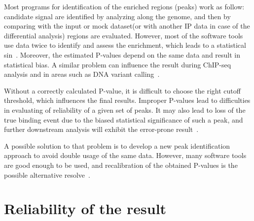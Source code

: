 Most programs for identification of the enriched regions (peaks) work as follow: candidate signal are identified by analyzing along the genome, and then by comparing with the input or mock dataset(or with another IP data in case of the differential analysis) regions are evaluated. 
However, most of the software tools use data twice to identify and assess the enrichment, which leads to a statistical sin~\cite{lun2014novo}. 
Moreover, the estimated P-values depend on the same data and result in statistical bias.
A similar problem can influence the result during ChIP-seq analysis and in areas such as DNA variant calling~\cite{chitpin2019recap}.

Without a correctly calculated P-value, it is difficult to choose the right cutoff threshold, which influences the final results. 
Improper P-values lead to difficulties in evaluating of reliability of a given set of peaks.
It may also lead to loss of the true binding event due to the biased statistical significance of such a peak, and further downstream analysis will exhibit the error-prone result~\cite{chitpin2019recap}. 

A possible solution to that problem is to develop a new peak identification approach to avoid double usage of the same data. 
However, many software tools are good enough to be used, and recalibration of the obtained P-values is the possible alternative resolve~\cite{chitpin2019recap}.

\section{Reliability of the result}